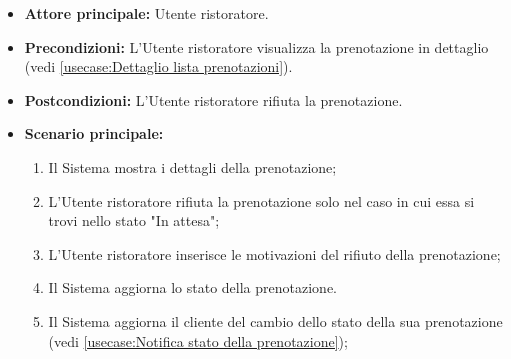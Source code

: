 \label{usecase:Rifiuta prenotazione}
\begin{itemize}
	\item \textbf{Attore principale:} Utente ristoratore.

	\item \textbf{Precondizioni:} L'Utente ristoratore visualizza la prenotazione in dettaglio (vedi \autoref{usecase:Dettaglio lista prenotazioni}).

	\item \textbf{Postcondizioni:} L'Utente ristoratore rifiuta la prenotazione.



	\item \textbf{Scenario principale:}
	      \begin{enumerate}
		      \item Il Sistema mostra i dettagli della prenotazione;
		      \item L'Utente ristoratore rifiuta la prenotazione solo nel caso in cui essa si trovi nello stato "In attesa";
		      \item L'Utente ristoratore inserisce le motivazioni del rifiuto della prenotazione;
		      \item Il Sistema aggiorna lo stato della prenotazione.
		      \item Il Sistema aggiorna il cliente del cambio dello stato della sua prenotazione (vedi \autoref{usecase:Notifica stato della prenotazione});

	      \end{enumerate}
\end{itemize}
